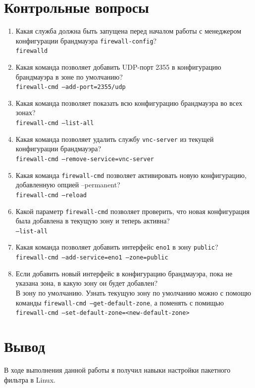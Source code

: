 \documentclass[12pt]{article}
\begin{document}
\section{Контрольные вопросы}
\begin{enumerate}
	\item Какая служба должна быть запущена перед началом работы с менеджером конфигурации брандмауэра \texttt{firewall-config}? \\
	      \texttt{firewalld}
	\item Какая команда позволяет добавить UDP-порт 2355 в конфигурацию брандмауэра в зоне по умолчанию? \\
	      \texttt{firewall-cmd --add-port=2355/udp}
	\item Какая команда позволяет показать всю конфигурацию брандмауэра во всех зонах? \\
	      \texttt{firewall-cmd --list-all}
	\item Какая команда позволяет удалить службу \texttt{vnc-server} из текущей конфигурации брандмауэра? \\
	      \texttt{firewall-cmd --remove-service=vnc-server}
	\item Какая команда \texttt{firewall-cmd} позволяет активировать новую конфигурацию, добавленную опцией --permanent? \\
	      \texttt{firewall-cmd --reload}
	\item Какой параметр \texttt{firewall-cmd} позволяет проверить, что новая конфигурация была добавлена в текущую зону и теперь активна? \\
	      \texttt{--list-all}
	\item Какая команда позволяет добавить интерфейс \texttt{eno1} в зону \texttt{public}? \\
	      \texttt{firewall-cmd --add-service=eno1 --zone=public}
	\item Если добавить новый интерфейс в конфигурацию брандмауэра, пока не указана зона, в какую зону он будет добавлен? \\
	      В зону по умолчанию. Узнать текущую зону по умолчанию можно с помощю команды \texttt{firewall-cmd --get-default-zone}, а поменять с помищью \texttt{firewall-cmd --set-default-zone=<new-default-zone>}
\end{enumerate}

\section{Вывод}
В ходе выполнения данной работы я получил навыки настройки пакетного фильтра в Linux.
\end{document}
